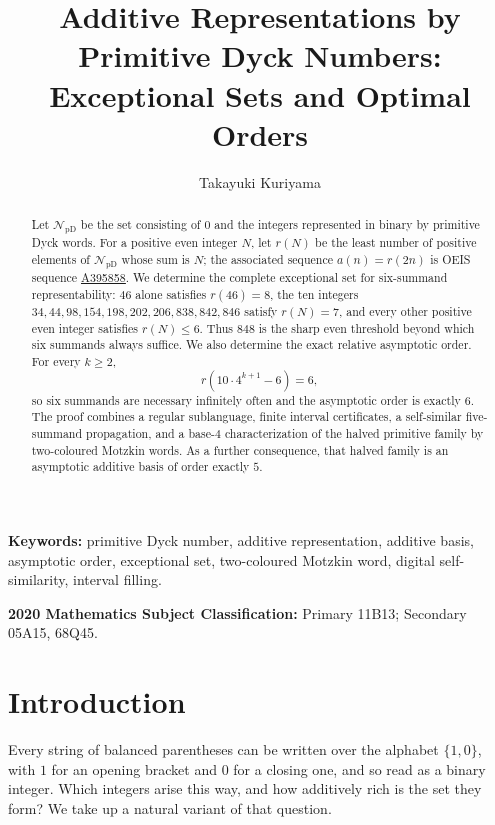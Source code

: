 \documentclass[12pt]{article}
\title{Additive Representations by Primitive Dyck Numbers:\\ Exceptional Sets and Optimal Orders}
\author{Takayuki Kuriyama}
\date{}
\theoremstyle{plain}
\theoremstyle{definition}
\theoremstyle{plain}
\newcommand{\NpD}{\mathcal{N}_{\mathrm{pD}}}
\newcommand{\seqnum}[1]{\href{https://oeis.org/#1}{\rm \underline{#1}}}
\begin{document}
\maketitle

\begin{abstract}
Let $\NpD$ be the set consisting of $0$ and the integers represented in
binary by primitive Dyck words.  For a positive even integer $N$, let $r(N)$
be the least number of positive elements of $\NpD$ whose sum is $N$; the
associated sequence $a(n)=r(2n)$ is OEIS sequence \seqnum{A395858}.  We
determine the complete exceptional set for six-summand representability:
$46$ alone satisfies $r(46)=8$, the ten integers
$34,44,98,154,198,202,206,838,842,846$ satisfy $r(N)=7$, and every other
positive even integer satisfies $r(N)\leq6$.  Thus $848$ is the sharp even
threshold beyond which six summands always suffice.  We also determine the
exact relative asymptotic order.  For every $k\geq2$,
\[
  r(10\cdot4^{k+1}-6)=6,
\]
so six summands are necessary infinitely often and the asymptotic order is
exactly $6$.  The proof combines a regular sublanguage, finite interval
certificates, a self-similar five-summand propagation, and a base-$4$
characterization of the halved primitive family by two-coloured Motzkin words.
As a further consequence, that halved family is an asymptotic additive basis
of order exactly $5$.
\end{abstract}

\noindent\textbf{Keywords:} primitive Dyck number, additive
representation, additive basis, asymptotic order, exceptional set,
two-coloured Motzkin word, digital self-similarity, interval filling.

\noindent\textbf{2020 Mathematics Subject Classification:} Primary 11B13;
Secondary 05A15, 68Q45.

\section{Introduction}\label{sec:introduction}

Every string of balanced parentheses can be written over the alphabet
$\{1,0\}$, with $1$ for an opening bracket and $0$ for a closing one,
and so read as a binary integer.  Which integers arise this way, and how
additively rich is the set they form?  We take up a natural variant of
that question.
\end{document}
